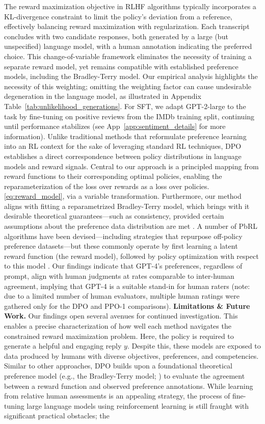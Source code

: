\begin{sproof}
The reward maximization objective in RLHF algorithms typically incorporates a KL-divergence constraint to limit the policy's deviation from a reference, effectively balancing reward maximization with regularization. Each transcript concludes with two candidate responses, both generated by a large (but unspecified) language model, with a human annotation indicating the preferred choice. This change-of-variable framework eliminates the necessity of training a separate reward model, yet remains compatible with established preference models, including the Bradley-Terry model. Our empirical analysis highlights the necessity of this weighting; omitting the weighting factor can cause undesirable degeneration in the language model, as illustrated in Appendix Table~\ref{tab:unlikelihood_generations}. For SFT, we adapt GPT-2-large to the task by fine-tuning on positive reviews from the IMDb training split, continuing until performance stabilizes (see App~\ref{app:sentiment_details} for more information). Unlike traditional methods that reformulate preference learning into an RL context for the sake of leveraging standard RL techniques, DPO establishes a direct correspondence between policy distributions in language models and reward signals. Central to our approach is a principled mapping from reward functions to their corresponding optimal policies, enabling the reparameterization of the loss over rewards as a loss over policies. \ref{eq:reward_model}, via a variable transformation. Furthermore, our method aligns with fitting a reparametrized Bradley-Terry model, which brings with it desirable theoretical guarantees—such as consistency, provided certain assumptions about the preference data distribution are met \cite{bong2022generalized}. A number of PbRL algorithms have been devised—including strategies that repurpose off-policy preference datasets—but these commonly operate by first learning a latent reward function (the reward model), followed by policy optimization with respect to this model \citep{jain2013learning,BusaFekete2014,christiano2017deep,sadigh2017active,kupcsik2018learning}. Our findings indicate that GPT-4’s preferences, regardless of prompt, align with human judgments at rates comparable to inter-human agreement, implying that GPT-4 is a suitable stand-in for human raters (note: due to a limited number of human evaluators, multiple human ratings were gathered only for the DPO and PPO-1 comparisons). \textbf{Limitations \& Future Work.} Our findings open several avenues for continued investigation. This enables a precise characterization of how well each method navigates the constrained reward maximization problem. Here, the policy is required to generate a helpful and engaging reply $y$. Despite this, these models are exposed to data produced by humans with diverse objectives, preferences, and competencies. Similar to other approaches, DPO builds upon a foundational theoretical preference model (e.g., the Bradley-Terry model; \cite{bradley1952rankanalysis}) to evaluate the agreement between a reward function and observed preference annotations. While learning from relative human assessments is an appealing strategy, the process of fine-tuning large language models using reinforcement learning is still fraught with significant practical obstacles; the 
\end{sproof}
